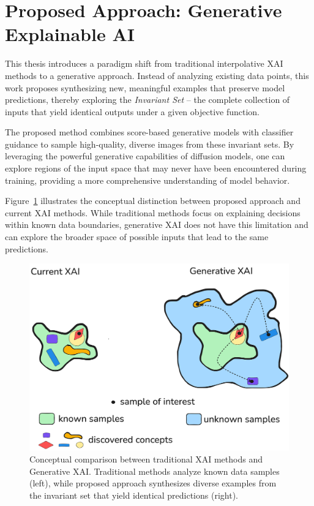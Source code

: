 \section{Proposed Approach: Generative Explainable AI}

This thesis introduces a paradigm shift from traditional interpolative XAI methods to a generative approach. Instead of analyzing existing data points, this work proposes synthesizing new, meaningful examples that preserve model predictions, thereby exploring the \textit{Invariant Set} -- the complete collection of inputs that yield identical outputs under a given objective function.

The proposed method combines score-based generative models with classifier guidance to sample high-quality, diverse images from these invariant sets. By leveraging the powerful generative capabilities of diffusion models, one can explore regions of the input space that may never have been encountered during training, providing a more comprehensive understanding of model behavior.

Figure~\ref{fig:1_teaser} illustrates the conceptual distinction between proposed approach and current XAI methods. While traditional methods focus on explaining decisions within known data boundaries, generative XAI does not have this limitation and can explore the broader space of possible inputs that lead to the same predictions.

\begin{figure}[h]
\centering
\includegraphics[width=0.8\linewidth]{figures/main/teaser1.png}
\caption{Conceptual comparison between traditional XAI methods and Generative XAI. Traditional methods analyze known data samples (left), while proposed approach synthesizes diverse examples from the invariant set that yield identical predictions (right).}
\label{fig:1_teaser}
\end{figure}

